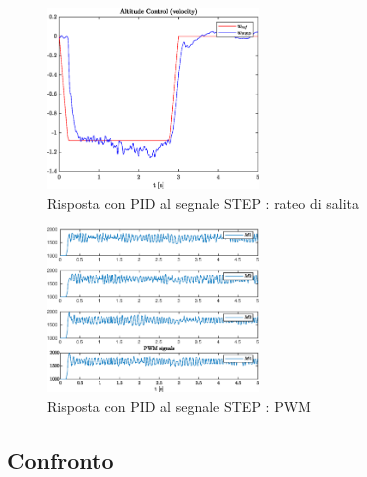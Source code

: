 \begin{figure}
	\centering
	\includegraphics[width=0.5\textwidth]{Simulazioni/Figure/SMC/STEP/AltitudeControlVel}
	\caption{Risposta con PID al segnale STEP : rateo di salita}
\end{figure}

\begin{figure}
	\centering
	\includegraphics[width=0.5\textwidth]{Simulazioni/Figure/SMC/STEP/PWM}
	\caption{Risposta con PID al segnale STEP : PWM}
\end{figure}

\clearpage
\subsection{Confronto}